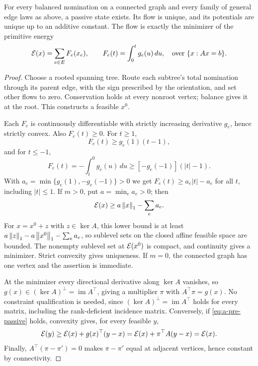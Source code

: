 \begin{theorem}
\label{thm:a-pre-existence}
For every balanced nomination on a connected graph and every family of
general edge laws as above, a passive state exists. Its flow is unique,
and its potentials are unique up to an additive constant. The flow is
exactly the minimizer of the primitive energy
\begin{equation}
 \mathcal{E}(x)=\sum_{e\in E}F_e(x_e),\qquad
 F_e(t)=\int_0^t g_e(u)\,du,
 \quad\text{over }\{x:Ax=b\}.
 \label{eq:a-pre-energy}
\end{equation}
\end{theorem}
\begin{proof}
Choose a rooted spanning tree. Route each subtree's total nomination
through its parent edge, with the sign prescribed by the orientation,
and set other flows to zero. Conservation holds at every nonroot vertex;
balance gives it at the root. This constructs a feasible $x^0$.

Each $F_e$ is continuously differentiable with strictly increasing
derivative $g_e$, hence strictly convex. Also $F_e(t)\ge0$. For $t\ge1$,
\[
 F_e(t)\ge g_e(1)(t-1),
\]
and for $t\le-1$,
\[
 F_e(t)=-\int_t^0g_e(u)\,du
       \ge[-g_e(-1)](|t|-1).
\]
With $a_e=\min\{g_e(1),-g_e(-1)\}>0$ we get
$F_e(t)\ge a_e|t|-a_e$ for all $t$, including $|t|\le1$. If $m>0$,
put $a=\min_e a_e>0$; then
\[
 \mathcal{E}(x)\ge a\left\lVert x\right\rVert_1-\sum_e a_e.
\]
For $x=x^0+z$ with $z\in\ker A$, this lower bound is at least
$a\left\lVert z\right\rVert_1-a\left\lVert x^0\right\rVert_1-\sum_e a_e$, so sublevel sets on the closed
affine feasible space are bounded. The nonempty sublevel set at
$\mathcal{E}(x^0)$ is compact, and continuity gives a minimizer. Strict convexity gives uniqueness. If $m=0$, the
connected graph has one vertex and the assertion is immediate.

At the minimizer every directional derivative along $\ker A$ vanishes,
so $g(x)\in(\ker A)^\perp=\operatorname{im}A^\top$, giving a
multiplier $\pi$ with $A^\top\pi=g(x)$. No constraint qualification is
needed, since $(\ker A)^\perp=\operatorname{im}A^\top$ holds for every
matrix, including the rank-deficient incidence matrix.
Conversely, if \cref{eq:a-pre-passive} holds, convexity gives, for every
feasible $y$,
\[
 \mathcal{E}(y)\ge\mathcal{E}(x)+g(x)^\top(y-x)
 =\mathcal{E}(x)+\pi^\top A(y-x)=\mathcal{E}(x).
\]
Finally, $A^\top(\pi-\pi')=0$ makes $\pi-\pi'$ equal at adjacent
vertices, hence constant by connectivity.
\end{proof}

